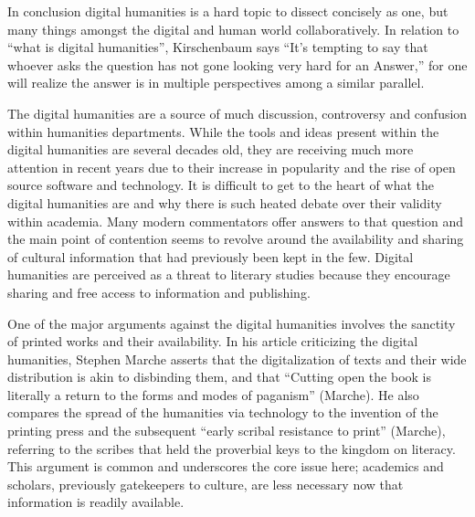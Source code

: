 \documentclass[]{article}
\begin{document}
In conclusion digital humanities is a hard topic to dissect concisely as
one, but many things amongst the digital and human world
collaboratively. In relation to ``what is digital humanities'',
Kirschenbaum says ``It's tempting to say that whoever asks the question
has not gone looking very hard for an Answer,'' for one will realize the
answer is in multiple perspectives among a similar parallel.

The digital humanities are a source of much discussion, controversy and
confusion within humanities departments. While the tools and ideas
present within the digital humanities are several decades old, they are
receiving much more attention in recent years due to their increase in
popularity and the rise of open source software and technology. It is
difficult to get to the heart of what the digital humanities are and why
there is such heated debate over their validity within academia. Many
modern commentators offer answers to that question and the main point of
contention seems to revolve around the availability and sharing of
cultural information that had previously been kept in the few. Digital
humanities are perceived as a threat to literary studies because they
encourage sharing and free access to information and publishing.

One of the major arguments against the digital humanities involves the
sanctity of printed works and their availability. In his article
criticizing the digital humanities, Stephen Marche asserts that the
digitalization of texts and their wide distribution is akin to
disbinding them, and that ``Cutting open the book is literally a return
to the forms and modes of paganism'' (Marche). He also compares the
spread of the humanities via technology to the invention of the printing
press and the subsequent ``early scribal resistance to print'' (Marche),
referring to the scribes that held the proverbial keys to the kingdom on
literacy. This argument is common and underscores the core issue here;
academics and scholars, previously gatekeepers to culture, are less
necessary now that information is readily available.
\end{document}
